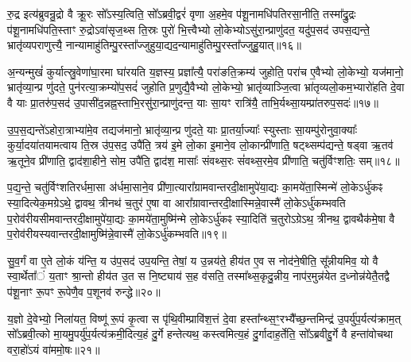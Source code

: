 रु॒द्र इत्य॑ब्रुवन्रु॒द्रो वै क्रू॒रः सो᳚\-ऽस्य॒त्विति॒ सो᳚\-ऽब्रवी॒द्वरं॑ वृणा अ॒हमे॒व प॑शू॒नामधि॑पतिरसा॒नीति॒ तस्मा᳚द्रु॒द्रः प॑शू॒नामधि॑पति॒स्ताꣳ रु॒द्रो\-ऽवा॑सृज॒थ्स ति॒स्रः पुरो॑ भि॒त्त्वैभ्यो लो॒केभ्यो\-ऽसु॑रा॒न्प्राणु॑दत॒ यदु॑प॒सद॑ उपस॒द्यन्ते॒ भ्रातृ॑व्यपराणुत्त्यै॒ नान्यामाहु॑तिम्पु॒रस्ता᳚ज्जुहुया॒द्यद॒न्यामाहु॑तिम्पु॒रस्ता᳚ज्जुहु॒यात्॥१६॥

अ॒न्यन्मुखं॑ कुर्यात्स्रु॒वेणा॑घा॒रमा घा॑रयति य॒ज्ञस्य॒ प्रज्ञा᳚त्यै॒ परा॑ङति॒क्रम्य॑ जुहोति॒ परा॑च ए॒वैभ्यो लो॒केभ्यो॒ यज॑मानो॒ भ्रातृ॑व्या॒न्प्र णु॑दते॒ पुन॑रत्या॒क्रम्यो॑प॒सदं॑ जुहोति प्र॒णुद्यै॒वैभ्यो लो॒केभ्यो॒ भ्रातृ॑व्याञ्जि॒त्वा भ्रा॑तृव्यलो॒कम॒भ्यारो॑हति दे॒वा वै याः प्रा॒तरु॑प॒सद॑ उ॒पासी॑द॒न्नह्न॒स्ताभि॒रसु॑रा॒न्प्राणु॑दन्त॒ याः सा॒यꣳ रात्रि॑यै॒ ताभि॒र्यथ्सा॒यम्प्रा॑तरुप॒सदः॑॥१७॥

उ॒प॒स॒द्यन्ते॑\-ऽहोरा॒त्राभ्या॑मे॒व तद्यज॑मानो॒ भ्रातृ॑व्या॒न्प्र णु॑दते॒ याः प्रा॒तर्या॒ज्याः᳚ स्युस्ताः सा॒यम्पु॑रोनुवा॒क्याः᳚ कुर्या॒दया॑तयामत्वाय ति॒स्र उ॑प॒सद॒ उपै॑ति॒ त्रय॑ इ॒मे लो॒का इ॒माने॒व लो॒कान्प्री॑णाति॒ षट्थ्सम्प॑द्यन्ते॒ षड्वा ऋ॒तव॑ ऋ॒तूने॒व प्री॑णाति॒ द्वाद॑शा॒हीने॒ सोम॒ उपै॑ति॒ द्वाद॑श॒ मासाः᳚ संवथ्स॒रः सं॑वथ्स॒रमे॒व प्री॑णाति॒ चतु॑र्विꣳशतिः॒ सम्॥१८॥

प॒द्य॒न्ते॒ चतु॑र्विꣳशतिरर्धमा॒सा अ॑र्धमा॒साने॒व प्री॑णा॒त्यारा᳚ग्रामवान्तरदी॒क्षामुपे॑या॒द्यः का॒मये॑ता॒स्मिन्मे॑ लो॒के\-ऽर्धु॑कꣴ स्या॒दित्येक॒मग्रे\-ऽथे॒ द्वावथ॒ त्रीनथ॑ च॒तुर॑ ए॒षा वा आरा᳚ग्रावान्तरदी॒क्षास्मिन्ने॒वास्मै॑ लो॒के\-ऽर्धु॑कम्भवति प॒रोव॑रीयसीमवान्तरदी॒क्षामुपे॑या॒द्यः का॒मये॑ता॒मुष्मि॑न्मे लो॒के\-ऽर्धु॑कꣴ स्या॒दिति॑ च॒तुरो\-ऽग्रे\-ऽथ॒ त्रीनथ॒ द्वावथैक॑मे॒षा वै प॒रोव॑रीयस्यवान्तरदी॒क्षामुष्मि॑न्ने॒वास्मै॑ लो॒के\-ऽर्धु॑कम्भवति॥१९॥

{\anuvakamend[{अ॒सि॒ष्य॒तीति॑ जुहु॒याथ्सा॒यम्प्रा॑तरुप॒सद॒श्चतु॑र्विꣳशतिः॒ सञ्च॒तुरो\-ऽग्रे॒ षोड॑श च॥३॥}]}

सु॒व॒र्गं वा ए॒ते लो॒कं य॑न्ति॒ य उ॑प॒सद॑ उप॒यन्ति॒ तेषां॒ य उ॒न्नय॑ते॒ हीय॑त ए॒व स नोद॑ने॒षीति॒ सू᳚न्नीयमिव॒ यो वै स्वा॒र्थेता᳚ं य॒ताꣳ श्रा॒न्तो हीय॑त उ॒त स नि॒ष्ट्याय॑ स॒ह व॑सति॒ तस्मा᳚थ्स॒कृदु॒न्नीय॒ नाप॑र॒मुन्न॑येत द॒ध्नोन्न॑येतै॒तद्वै प॑शू॒नाꣳ रू॒पꣳ रू॒पेणै॒व प॒शूनव॑ रुन्द्धे॥२०॥

य॒ज्ञो दे॒वेभ्यो॒ निला॑यत॒ विष्णू॑ रू॒पं कृ॒त्वा स पृ॑थि॒वीम्प्रावि॑श॒त्तं दे॒वा हस्ता᳚न्थ्स॒ꣳ॒रभ्यै᳚च्छ॒न्तमिन्द्र॑ उ॒पर्यु॑प॒र्यत्य॑क्राम॒त् सो᳚\-ऽब्रवी॒त्को मा॒यमु॒पर्यु॑प॒र्यत्य॑क्रमी॒दित्य॒हं दु॒र्गे हन्तेत्यथ॒ कस्त्वमित्य॒हं दु॒र्गादाह॒र्तेति॒ सो᳚\-ऽब्रवीद्दु॒र्गे वै हन्ता॑वोचथा वरा॒हो॑\-ऽयं वा॑ममो॒षः॥२१॥

